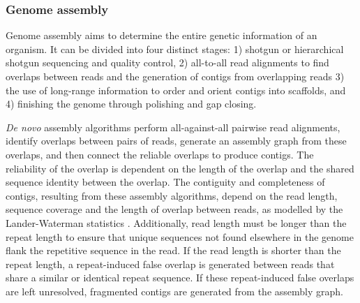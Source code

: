 \subsubsection{Genome assembly}

Genome assembly aims to determine the entire genetic information of an organism. It can be divided into four distinct stages: 1) shotgun or hierarchical shotgun sequencing and quality control, 2) all-to-all read alignments to find overlaps between reads and the generation of contigs from overlapping reads 3) the use of long-range information to order and orient contigs into scaffolds, and 4) finishing the genome through polishing and gap closing.

\textit{De novo} assembly algorithms perform all-against-all pairwise read alignments, identify overlaps between pairs of reads, generate an assembly graph from these overlaps, and then connect the reliable overlaps to produce contigs. The reliability of the overlap is dependent on the length of the overlap and the shared sequence identity between the overlap. The contiguity and completeness of contigs, resulting from these assembly algorithms, depend on the read length, sequence coverage and the length of overlap between reads, as modelled by the Lander-Waterman statistics \cite{Lander1988-hu}. Additionally, read length must be longer than the repeat length to ensure that unique sequences not found elsewhere in the genome flank the repetitive sequence in the read. If the read length is shorter than the repeat length, a repeat-induced false overlap is generated between reads that share a similar or identical repeat sequence. If these repeat-induced false overlaps are left unresolved, fragmented contigs are generated from the assembly graph. 

